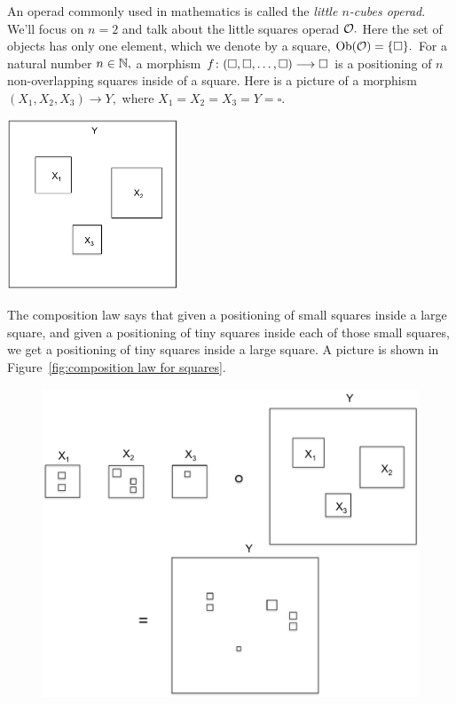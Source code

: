 \documentclass[CT4S-EN-RU]{subfiles}
\begin{document}
\begin{exampleRUS}
\end{exampleRUS}

\begin{exampleENG}\label{ex:little squares}
An operad commonly used in mathematics is called the {\em little $n$-cubes operad}. We'll focus on $n=2$ and talk about the little squares operad $\mathcal{O}.$ Here the set of objects has only one element, which we denote by a square, $\textnormal{Ob}(\mathcal{O})=\{\square\}.$ For a natural number $n\in{\mathbb N},$ a morphism $f\colon(\square,\square,\ldots,\square)\longrightarrow\square$ is a positioning of $n$ non-overlapping squares inside of a square. Here is a picture of a morphism $(X_1,X_2,X_3)\to Y,$ where $X_1=X_2=X_3=Y=\square.$
\begin{center}
\includegraphics[height=2in]{square1}
\end{center}
The composition law says that given a positioning of small squares inside a large square, and given a positioning of tiny squares inside each of those small squares, we get a positioning of tiny squares inside a large square. A picture is shown in Figure~\ref{fig:composition law for squares}.
\begin{figure}[H]
\begin{center}
\includegraphics[width=\textwidth]{square2}

\end{center}
\end{figure}
\end{exampleENG}
\end{document}
